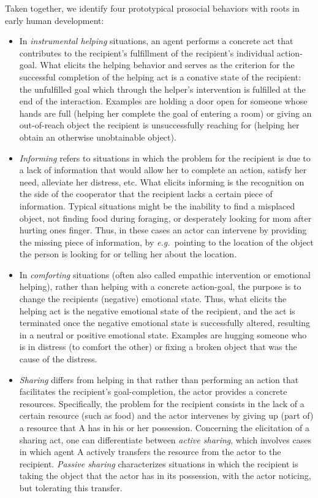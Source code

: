 \documentclass{article}
\newcommand{\eg}{{\textit{e.g.~}}}
\begin{document}
Taken together, we identify four prototypical prosocial behaviors with roots in
early human development: 

\begin{itemize}

\item In \textit{instrumental helping} situations, an agent performs a concrete
act that contributes to the recipient{}'s fulfillment of the recipient{}'s
individual action-goal. What elicits the helping behavior and serves as the
criterion for the successful completion of the helping act is a conative state
of the recipient: the unfulfilled goal which through the helper{}'s
intervention is fulfilled at the end of the interaction. Examples are holding a
door open for someone whose hands are full (helping her complete the goal of
entering a room) or giving an out-of-reach object the recipient is
unsuccessfully reaching for (helping her obtain an otherwise unobtainable
object).

\item \textit{Informing} refers to situations in which the problem for the
recipient is due to a lack of information that would allow her to complete an
action, satisfy her need, alleviate her distress, etc. What elicits informing
is the recognition on the side of the cooperator that the recipient lacks a
certain piece of information. Typical situations might be the inability to find
a misplaced object, not finding food during foraging, or desperately looking
for mom after hurting ones finger. Thus, in these cases an actor can intervene
by providing the missing piece of information, by \eg pointing to the
location of the object the person is looking for or telling her about the
location.

\item In \textit{comforting} situations (often also called empathic
intervention or emotional helping), rather than helping with a concrete
action-goal, the purpose is to change the recipients (negative) emotional
state. Thus, what elicits the helping act is the negative emotional state of
the recipient, and the act is terminated once the negative emotional state is
successfully altered, resulting in a neutral or positive emotional state.
Examples are hugging someone who is in distress (to comfort the other) or
fixing a broken object that was the cause of the distress.

\item \textit{Sharing} differs from helping in that rather than performing an
action that facilitates the recipient{}'s goal-completion, the actor provides a
concrete resources. Specifically, the problem for the recipient consists in the
lack of a certain resource (such as food) and the actor intervenes by giving up
(part of) a resource that A has in his or her possession. Concerning the
elicitation of a sharing act, one can differentiate between \textit{active
sharing}, which involves cases in which agent A actively transfers the resource
from the actor to the recipient.  \textit{Passive sharing} characterizes
situations in which the recipient is taking the object that the actor has in
its possession, with the actor noticing, but tolerating this transfer. 

\end{itemize}
\end{document}
